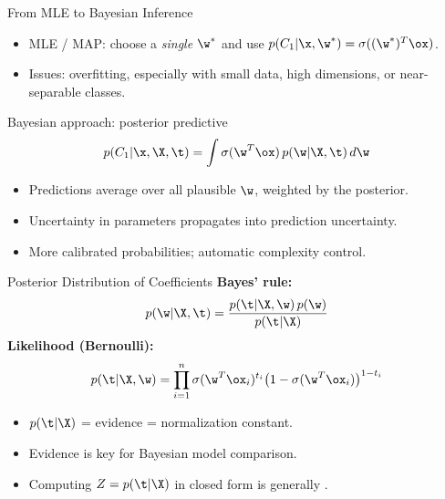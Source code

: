 \begin{frame}{From MLE to Bayesian Inference}
  \begin{itemize}
    \item MLE / MAP: choose a \emph{single} $\w^*$ and use $p(C_1|\x,\w^*) = \sigma((\w^*)^T\ox)$.
    \item Issues: overfitting, especially with small data, high dimensions, or near-separable classes.
  \end{itemize}
  \vspace{0.3cm}
  \begin{block}{Bayesian approach: posterior predictive}
    \[
      p(C_1|\x,\X,\t) = \int \sigma(\w^T\ox)\,p(\w|\X,\t)\,d\w
    \]
    \begin{itemize}
      \item Predictions average over all plausible $\w$, weighted by the posterior.
      \item Uncertainty in parameters propagates into prediction uncertainty.
      \item More calibrated probabilities; automatic complexity control.
    \end{itemize}
  \end{block}
\end{frame}

\begin{frame}{Posterior Distribution of Coefficients}
  \textbf{Bayes' rule:}
  \[
    p(\w|\X,\t) = \frac{p(\t|\X,\w)\,p(\w)}{p(\t|\X)}
  \]
  \textbf{Likelihood (Bernoulli):}
  \[
    p(\t|\X,\w) = \prod_{i=1}^n \sigma(\w^T\ox_i)^{t_i}\bigl(1-\sigma(\w^T\ox_i)\bigr)^{1-t_i}
  \]
  \begin{itemize}
    \item $p(\t|\X)$ = evidence = normalization constant.
    \item Evidence is key for Bayesian model comparison.
    \item Computing $Z = p(\t|\X)$ in closed form is generally .
  \end{itemize}
\end{frame}

